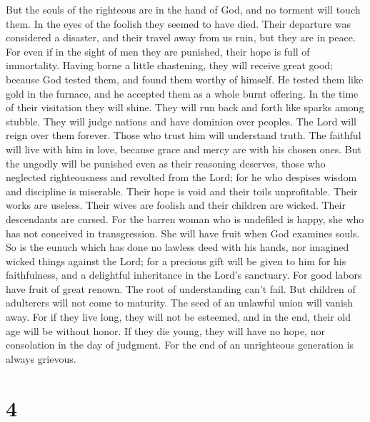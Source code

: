  But the souls of the righteous are in the hand of God,
and no torment will touch them.  In the eyes of the
foolish they seemed to have died. Their departure was considered a
disaster,  and their travel away from us ruin, but they
are in peace.  For even if in the sight of men they are
punished, their hope is full of immortality.  Having borne
a little chastening, they will receive great good; because God tested
them, and found them worthy of himself.  He tested them
like gold in the furnace, and he accepted them as a whole burnt
offering.  In the time of their visitation they will
shine. They will run back and forth like sparks among stubble.
 They will judge nations and have dominion over peoples.
The Lord will reign over them forever.  Those who trust
him will understand truth. The faithful will live with him in love,
because grace and mercy are with his chosen ones.  But
the ungodly will be punished even as their reasoning deserves, those who
neglected righteousness and revolted from the Lord;  for
he who despises wisdom and discipline is miserable. Their hope is void
and their toils unprofitable. Their works are useless. 
Their wives are foolish and their children are wicked. 
Their descendants are cursed. For the barren woman who is undefiled is
happy, she who has not conceived in transgression. She will have fruit
when God examines souls.  So is the eunuch which has done
no lawless deed with his hands, nor imagined wicked things against the
Lord; for a precious gift will be given to him for his faithfulness, and
a delightful inheritance in the Lord's sanctuary.  For
good labors have fruit of great renown. The root of understanding can't
fail.  But children of adulterers will not come to
maturity. The seed of an unlawful union will vanish away.
 For if they live long, they will not be esteemed, and in
the end, their old age will be without honor.  If they
die young, they will have no hope, nor consolation in the day of
judgment.  For the end of an unrighteous generation is
always grievous.

\hypertarget{section-3}{%
\section{4}\label{section-3}}

